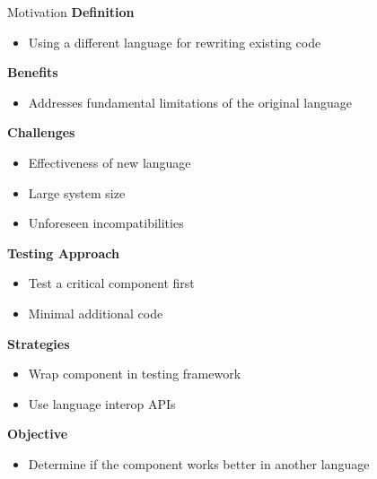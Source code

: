 \begin{frame}{Motivation}
    \textbf{Definition}
    \begin{itemize}
        \item Using a different language for rewriting existing code
    \end{itemize}
    \pause
    \textbf{Benefits}
    \begin{itemize}
        \item Addresses fundamental limitations of the original language
    \end{itemize}
    \pause
    \textbf{Challenges}
    \begin{itemize}
        \item Effectiveness of new language
        \item Large system size
        \item Unforeseen incompatibilities
    \end{itemize}
    \pause
    \textbf{Testing Approach}
    \begin{itemize}
        \item Test a critical component first
        \item Minimal additional code
    \end{itemize}
    \pause
    \textbf{Strategies}
    \begin{itemize}
        \item Wrap component in testing framework
        \item Use language interop APIs
    \end{itemize}
    \pause
    \textbf{Objective}
    \begin{itemize}
        \item Determine if the component works better in another language
    \end{itemize}
\end{frame}